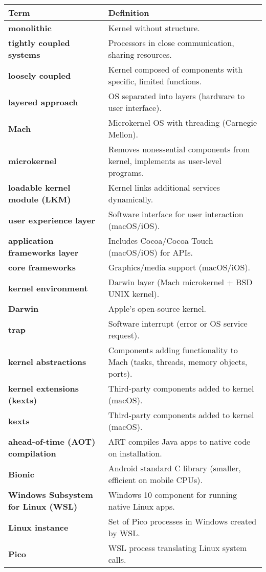 \begin{tabular}{>{\raggedright}p{} >{\raggedright\arraybackslash}p{}}
\toprule
\textbf{Term} & \textbf{Definition} \\
\midrule
\textbf{monolithic} & Kernel without structure. \\
\textbf{tightly coupled systems} & Processors in close communication, sharing resources. \\
\textbf{loosely coupled} & Kernel composed of components with specific, limited functions. \\
\textbf{layered approach} & OS separated into layers (hardware to user interface). \\
\textbf{Mach} & Microkernel OS with threading (Carnegie Mellon). \\
\textbf{microkernel} & Removes nonessential components from kernel, implements as user-level programs. \\
\textbf{loadable kernel module (LKM)} & Kernel links additional services dynamically. \\
\textbf{user experience layer} & Software interface for user interaction (macOS/iOS). \\
\textbf{application frameworks layer} & Includes Cocoa/Cocoa Touch (macOS/iOS) for APIs. \\
\textbf{core frameworks} & Graphics/media support (macOS/iOS). \\
\textbf{kernel environment} & Darwin layer (Mach microkernel + BSD UNIX kernel). \\
\textbf{Darwin} & Apple's open-source kernel. \\
\textbf{trap} & Software interrupt (error or OS service request). \\
\textbf{kernel abstractions} & Components adding functionality to Mach (tasks, threads, memory objects, ports). \\
\textbf{kernel extensions (kexts)} & Third-party components added to kernel (macOS). \\
\textbf{kexts} & Third-party components added to kernel (macOS). \\
\textbf{ahead-of-time (AOT) compilation} & ART compiles Java apps to native code on installation. \\
\textbf{Bionic} & Android standard C library (smaller, efficient on mobile CPUs). \\
\textbf{Windows Subsystem for Linux (WSL)} & Windows 10 component for running native Linux apps. \\
\textbf{Linux instance} & Set of Pico processes in Windows created by WSL. \\
\textbf{Pico} & WSL process translating Linux system calls. \\
\bottomrule
\end{tabular}
\vspace{\baselineskip}
